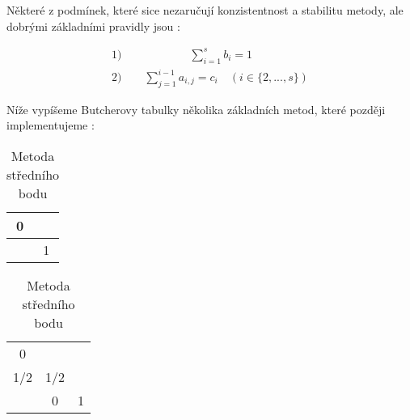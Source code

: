 \documentclass[12pt, a4paper,
 twoside,        %
 openright
]{report}
\begin{document}
Některé z podmínek, které sice nezaručují konzistentnost a stabilitu metody, ale dobrými základními pravidly jsou \cite{Butcher_tab_def}:

\begin{equation}
    \label{eq:RK_def}
    \begin{gathered}
        \text{1)} \quad \quad \qquad \qquad \sum_{i=1}^{s} b_i = 1 \qquad \qquad \\
        \text{2)} \quad \quad \sum_{j=1}^{i-1} a_{i,j} = c_i \quad (i \in \{2,...,s\})
    \end{gathered}
\end{equation}

Níže vypíšeme Butcherovy tabulky několika základních metod, které později implementujeme \cite{RK_methods_list}:

\begin{table}[H]
    \parbox{.45\linewidth}{
        \centering
        \caption[Butcherova tabulka Eulerovy metody]{\textbf{Eulerova metoda}}
        \begin{tabular}{c | c}
            0 & \\
            \hline
            & 1 \\
        \end{tabular}
    }
    \hfill
    \parbox{.45\linewidth}{
        \centering
        \caption[Butcherova tabulka metody středního bodu]{Metoda středního bodu}
        \begin{tabular}{c | c c}
            0 & \\
            1/2 & 1/2\\
            \hline
            & 0 & 1 \\
        \end{tabular}
    }
\end{table}
\end{document}
